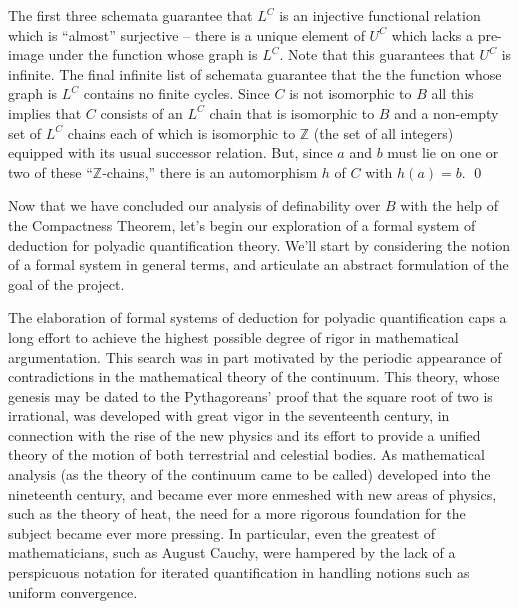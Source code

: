 The first three schemata guarantee that $L^C$ is an injective functional relation which is ``almost'' surjective -- there is a unique element of $U^C$ which lacks a pre-image under the function whose graph is $L^C$. Note that this guarantees that $U^C$ is infinite. The final infinite list of schemata guarantee that the the function whose graph is $L^C$ contains no finite cycles. Since $C$ is not isomorphic to $B$ all this implies that $C$ consists of an $L^C$ chain that is isomorphic to $B$ and a non-empty set of $L^C$ chains each of which is isomorphic to $\mathbb{Z}$ (the set of all integers) equipped with its usual successor relation. But, since $a$ and $b$ must lie on one or two of these ``$\mathbb{Z}$-chains,'' there is an automorphism $h$ of $C$ with $h(a)=b$. \qed

Now that we have concluded our analysis of definability over $B$ with the help of the Compactness Theorem, let's begin our exploration of a formal system of deduction for polyadic quantification theory. We'll start by considering the notion of a formal system in general terms, and articulate an abstract formulation of the goal of the project.

The elaboration of formal systems of deduction for polyadic quantification caps a long effort to achieve the highest possible degree of rigor in mathematical argumentation. This search was in part motivated by the periodic appearance of contradictions in the mathematical theory of the continuum. This theory, whose genesis may be dated to the Pythagoreans' proof that the square root of two is irrational, was developed with great vigor in the seventeenth century, in connection with the rise of the new physics and its effort to provide a unified theory of the motion of both terrestrial and celestial bodies. As mathematical analysis (as the theory of the continuum came to be called) developed into the nineteenth century, and became ever more enmeshed with new areas of physics, such as the theory of heat, the need for a more rigorous foundation for the subject became ever more pressing. In particular, even the greatest of mathematicians, such as August Cauchy, were hampered by the lack of a perspicuous notation for iterated quantification in handling notions such as uniform convergence. 

\fi